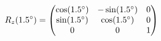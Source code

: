 \documentclass[preview]{standalone}
\begin{document}
\begin{align*}
\special{dvisvgm:raw <g id='unique000'>}R_z(1.5^\circ) = \begin{pmatrix} \cos(1.5^\circ) & -\sin(1.5^\circ) & 0 \\ \sin(1.5^\circ) & \cos(1.5^\circ) & 0 \\ 0 & 0 & 1 \end{pmatrix}\special{dvisvgm:raw </g>}
\end{align*}
\end{document}

